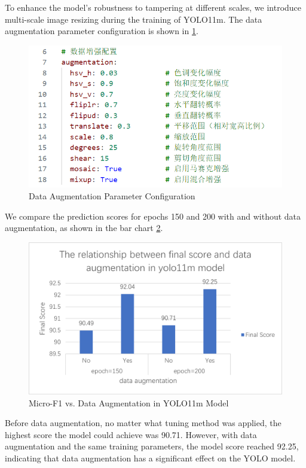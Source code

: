 To enhance the model's robustness to tampering at different scales, we introduce multi-scale image resizing during the training of YOLO11m. The data augmentation parameter configuration is shown in \cref{fig:yolo-data-code}.
\begin{figure}[t]
  \centering
  \includegraphics[width=0.8\linewidth]{./graphs/图片6.png}

  \caption{Data Augmentation Parameter Configuration}
  \label{fig:yolo-data-code}
\end{figure}

We compare the prediction scores for epochs 150 and 200 with and without data augmentation, as shown in the bar chart \cref{fig:yolo-data}.
\begin{figure}[t]
  \centering
  \includegraphics[width=0.8\linewidth]{./graphs/图片7.png}

  \caption{Micro-F1 vs. Data Augmentation in YOLO11m Model}
  \label{fig:yolo-data}
\end{figure}

Before data augmentation, no matter what tuning method was applied, the highest score the model could achieve was 90.71. However, with data augmentation and the same training parameters, the model score reached 92.25, indicating that data augmentation has a significant effect on the YOLO model.

